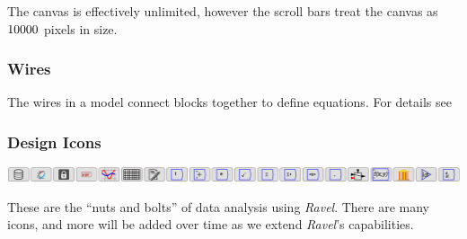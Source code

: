 The canvas is effectively unlimited, however the scroll bars treat
the canvas as $10000\time10000$ pixels in size.

\subsubsection{Wires}

The wires in a model connect blocks together to define equations.
For details see 

\subsubsection{Design Icons}

\noindent\includegraphics[width=\textwidth]{images/DesignIcons}

These are the ``nuts and bolts'' of data analysis using \emph{Ravel}.
There are many icons, and more will be added over time as we extend
\emph{Ravel}'s capabilities.

